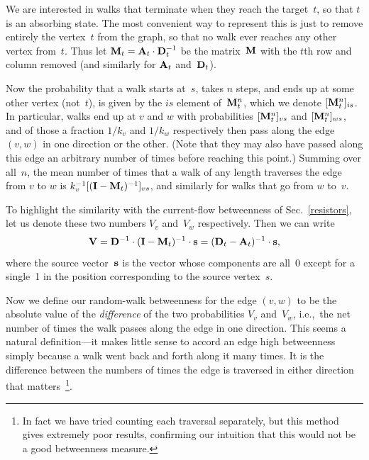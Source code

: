 \documentclass[twocolumn,pre,superscriptaddress]{revtex4}
\begin{document}
We are interested in walks that terminate when they reach the target~$t$,
so that $t$ is an absorbing state.  The most convenient way to represent
this is just to remove entirely the vertex~$t$ from the graph, so that no
walk ever reaches any other vertex from~$t$.  Thus let
$\mathbf{M}_t=\mathbf{A}_t\cdot\mathbf{D}_t^{-1}$ be the matrix~$\mathbf{M}$ with the $t$th row and
column removed (and similarly for $\mathbf{A}_t$ and~$\mathbf{D}_t$).

Now the probability that a walk starts at~$s$, takes $n$ steps, and ends up
at some other vertex (not~$t$), is given by the $is$ element of~$\mathbf{M}_t^n$,
which we denote $[\mathbf{M}_t^n]_{is}$.  In particular, walks end up at $v$ and
$w$ with probabilities $[\mathbf{M}_t^n]_{vs}$ and $[\mathbf{M}_t^n]_{ws}$, and of those
a fraction $1/k_v$ and $1/k_w$ respectively then pass along the edge
$(v,w)$ in one direction or the other.  (Note that they may also have
passed along this edge an arbitrary number of times before reaching this
point.)  Summing over all~$n$, the mean number of times that a walk of any
length traverses the edge from $v$ to $w$ is $k_v^{-1}
[(\mathbf{I}-\mathbf{M}_t)^{-1}]_{vs}$, and similarly for walks that go from $w$ to~$v$.

To highlight the similarity with the current-flow betweenness of
Sec.~\ref{resistors}, let us denote these two numbers $V_v$ and~$V_w$
respectively.  Then we can write
\begin{equation}
\mathbf{V} = \mathbf{D}^{-1}\cdot(\mathbf{I}-\mathbf{M}_t)^{-1}\cdot\mathbf{s}
    = (\mathbf{D}_t - \mathbf{A}_t)^{-1}\cdot\mathbf{s},
\label{defsvv}
\end{equation}
where the source vector~$\mathbf{s}$ is the vector whose components are all~0
except for a single~1 in the position corresponding to the source
vertex~$s$.

Now we define our random-walk betweenness for the edge $(v,w)$ to be the
absolute value of the \emph{difference} of the two probabilities $V_v$
and~$V_w$, i.e.,~the net number of times the walk passes along the edge in
one direction.  This seems a natural definition---it makes little sense to
accord an edge high betweenness simply because a walk went back and forth
along it many times.  It is the difference between the numbers of times the
edge is traversed in either direction that matters~\footnote{In fact we
have tried counting each traversal separately, but this method gives
extremely poor results, confirming our intuition that this would not be a
good betweenness measure.}.
\end{document}
